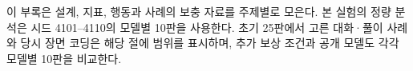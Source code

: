 \setcounter{secnumdepth}{2}
\renewcommand{\thesection}{\Alph{section}}
\renewcommand{\thefigure}{\thesection.\arabic{figure}}
\renewcommand{\thetable}{\thesection.\arabic{table}}
\renewcommand{\theequation}{\thesection.\arabic{equation}}
\renewcommand{\theHsection}{supplement.\arabic{section}}
\renewcommand{\theHfigure}{supplement.\arabic{section}.\arabic{figure}}
\renewcommand{\theHtable}{supplement.\arabic{section}.\arabic{table}}
\renewcommand{\theHequation}{supplement.\arabic{section}.\arabic{equation}}
\label{sec:rw-appendix}
이 부록은 설계, 지표, 행동과 사례의 보충 자료를 주제별로 모은다. 본 실험의 정량 분석은 시드 4101--4110의 모델별 10판을 사용한다. 초기 25판에서 고른 대화·풀이 사례와 당시 장면 코딩은 해당 절에 범위를 표시하며, 추가 보상 조건과 공개 모델도 각각 모델별 10판을 비교한다.

